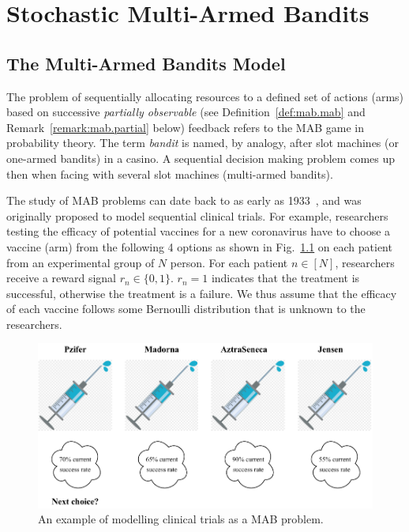 \chapter{Stochastic Multi-Armed Bandits}\label{CHAP:MAB}
	\minitoc
	\newpage


\section{The Multi-Armed Bandits Model}\label{sec:mab.model}

The problem of sequentially allocating resources to a defined set of actions (arms) based on successive \emph{partially observable} (see Definition~\ref{def:mab.mab} and Remark~\ref{remark:mab.partial} below) feedback refers to the MAB game in probability theory. The term \emph{bandit} is named, by analogy, after slot machines (or one-armed bandits) in a casino. A sequential decision making problem comes up then when facing with several slot machines (multi-armed bandits).

The study of MAB problems can date back to as early as 1933~\citep{thompson1933}, and was originally proposed to model sequential clinical trials. For example, researchers testing the efficacy of potential vaccines for a new coronavirus have to choose a vaccine (arm) from the following 4 options as shown in Fig.~\ref{fig:mab.covid} on each patient from an experimental group of $N$ person. For each patient $n\in[N]$, researchers receive a reward signal $r_n\in\{0,1\}$. $r_n=1$ indicates that the treatment is successful, otherwise the treatment is a failure. We thus assume that the efficacy of each vaccine follows some Bernoulli distribution that is unknown to the researchers.

\begin{figure}[ht]
    \centering
    \includegraphics[width=\textwidth]{Chapter2/img/covid.pdf}
    \caption{An example of modelling clinical trials as a MAB problem.}
    \label{fig:mab.covid}
\end{figure}


